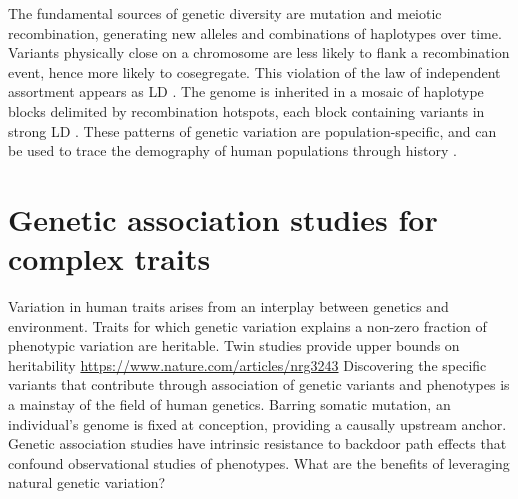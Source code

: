 \begin{outline}
\1 The fundamental sources of genetic diversity are mutation and meiotic recombination, generating new alleles and combinations of haplotypes over time.
Variants physically close on a chromosome are less likely to flank a recombination event, hence more likely to cosegregate.
This violation of the law of independent assortment appears as \gls{LD} \autocite{slatkin2008LinkageDisequilibriumUnderstanding}.
The genome is inherited in a mosaic of haplotype blocks delimited by recombination hotspots, each block containing variants in strong \gls{LD} \autocite{theinternationalhapmapconsortium2007SecondGenerationHuman}.
These patterns of genetic variation are population-specific, and can be used to trace the demography of human populations through history \autocite{karczewski2020AnalyticTranslationalGenetics}.

\section{Genetic association studies for complex traits}

\1 Variation in human traits arises from an interplay between genetics and environment.
Traits for which genetic variation explains a non-zero fraction of phenotypic variation are heritable.
    \2 Twin studies provide upper bounds on heritability \url{https://www.nature.com/articles/nrg3243}
\1 Discovering the specific variants that contribute through association of genetic variants and phenotypes is a mainstay of the field of human genetics.
Barring somatic mutation, an individual's genome is fixed at conception, providing a causally upstream anchor.
Genetic association studies have intrinsic resistance to backdoor path effects that confound observational studies of phenotypes.
    \2 What are the benefits of leveraging natural genetic variation?


\end{outline}
